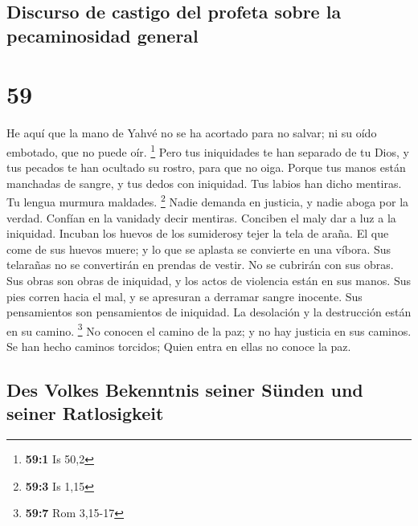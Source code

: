 \hypertarget{discurso-de-castigo-del-profeta-sobre-la-pecaminosidad-general}{%
\subsection{Discurso de castigo del profeta sobre la pecaminosidad
general}\label{discurso-de-castigo-del-profeta-sobre-la-pecaminosidad-general}}

\hypertarget{section-58}{%
\section{59}\label{section-58}}

 He aquí que la mano de Yahvé no se ha acortado para no
salvar; ni su oído embotado, que no puede oír. \footnote{\textbf{59:1}
  Is 50,2}  Pero tus iniquidades te han separado de tu
Dios, y tus pecados te han ocultado su rostro, para que no oiga.
 Porque tus manos están manchadas de sangre, y tus dedos
con iniquidad. Tus labios han dicho mentiras. Tu lengua murmura
maldades. \footnote{\textbf{59:3} Is 1,15}  Nadie demanda
en justicia, y nadie aboga por la verdad. Confían en la vanidady decir
mentiras. Conciben el maly dar a luz a la iniquidad. 
Incuban los huevos de los sumiderosy tejer la tela de araña. El que come
de sus huevos muere; y lo que se aplasta se convierte en una víbora.
 Sus telarañas no se convertirán en prendas de vestir. No
se cubrirán con sus obras. Sus obras son obras de iniquidad, y los actos
de violencia están en sus manos.  Sus pies corren hacia el
mal, y se apresuran a derramar sangre inocente. Sus pensamientos son
pensamientos de iniquidad. La desolación y la destrucción están en su
camino. \footnote{\textbf{59:7} Rom 3,15-17}  No conocen
el camino de la paz; y no hay justicia en sus caminos. Se han hecho
caminos torcidos; Quien entra en ellas no conoce la paz.

\hypertarget{des-volkes-bekenntnis-seiner-suxfcnden-und-seiner-ratlosigkeit}{%
\subsection{Des Volkes Bekenntnis seiner Sünden und seiner
Ratlosigkeit}\label{des-volkes-bekenntnis-seiner-suxfcnden-und-seiner-ratlosigkeit}}

